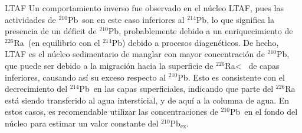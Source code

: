 \documentclass[9pt]{beamer}
\newcommand{\Ra}{$^{226}$Ra}
\newcommand{\PbCero}{$^{210}$Pb}
\newcommand{\PbCeroEx}{$^{210}$Pb$_\text{ex}$}
\newcommand{\PbCuatro}{$^{214}$Pb}
\begin{document}
\begin{frame}[noframenumbering]{LTAF}
\justifying Un comportamiento inverso fue observado en el núcleo LTAF, pues las actividades de \PbCero\, son en este caso inferiores al \PbCuatro, lo que significa la presencia de un déficit de \PbCero, probablemente  debido a un enriquecimiento de \Ra\, (en equilibrio con el \PbCuatro) debido a procesos diagenéticos. De hecho, LTAF es el núcleo sedimentario de manglar con mayor concentración de \PbCero, que puede ser debido a la migración hacia la superficie de \Ra<  \, de capas inferiores, causando así su exceso respecto al \PbCero. Esto es consistente con el decrecimiento del \PbCuatro\, en las capas superficiales, indicando que parte del \Ra\, está siendo transferido al agua intersticial, y de aquí a la columna de agua. En estos casos, es recomendable utilizar las concentraciones de \PbCero\, en el fondo del núcleo para estimar un valor constante del \PbCeroEx. 
	\begin{flushright}
	\hyperlink{Portada}{}
	\end{flushright}
\end{frame}
\end{document}
